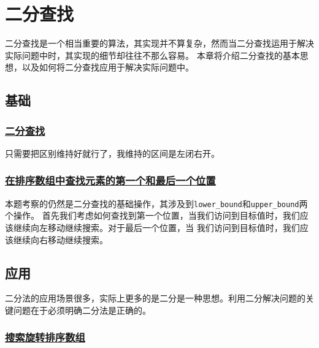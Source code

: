 \documentclass[../../main.tex]{subfiles}
\begin{document}
\setchapterpreamble[u]{\margintoc}

\chapter{二分查找}

二分查找是一个相当重要的算法，其实现并不算复杂，然而当二分查找运用于解决实际问题中时，其实现的细节却往往不那么容易。
本章将介绍二分查找的基本思想，以及如何将二分查找应用于解决实际问题中。

\section{基础}

\subsection{\href{https://leetcode.cn/problems/binary-search/}{二分查找}}

只需要把区别维持好就行了，我维持的区间是左闭右开。



\subsection{\href{https://leetcode.cn/problems/find-first-and-last-position-of-element-in-sorted-array/}
{在排序数组中查找元素的第一个和最后一个位置}}

本题考察的仍然是二分查找的基础操作，其涉及到\texttt{lower\_bound}和\texttt{upper\_bound}两个操作。
首先我们考虑如何查找到第一个位置，当我们访问到目标值时，我们应该继续向左移动继续搜索。对于最后一个位置，当
我们访问到目标值时，我们应该继续向右移动继续搜索。



\section{应用}

二分法的应用场景很多，实际上更多的是二分是一种思想。利用二分解决问题的关键问题在于必须明确二分法是正确的。

\subsection{\href{https://leetcode.cn/problems/search-in-rotated-sorted-array/}{搜索旋转排序数组}}
\end{document}
